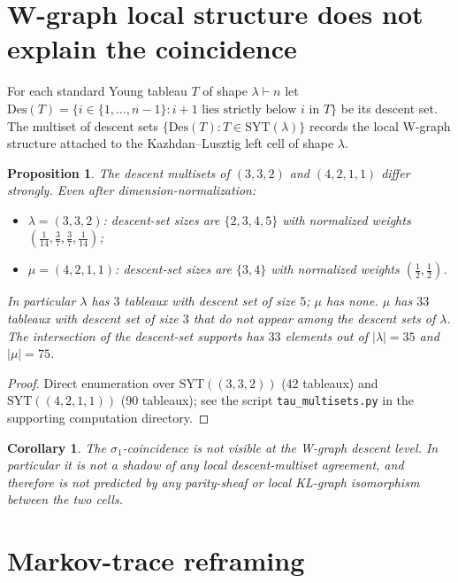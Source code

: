 \documentclass[11pt]{article}
\newtheorem{proposition}[theorem]{Proposition}
\newtheorem{corollary}[theorem]{Corollary}
\theoremstyle{definition}
\theoremstyle{remark}
\begin{document}
\section{W-graph local structure does not explain the coincidence}

For each standard Young tableau $T$ of shape $\lambda \vdash n$ let
$\mathrm{Des}(T) = \{i \in \{1, \dots, n-1\} : i+1 \text{ lies strictly below } i \text{ in } T\}$
be its descent set.  The multiset of descent sets $\{\mathrm{Des}(T)
: T \in \mathrm{SYT}(\lambda)\}$ records the local W-graph structure
attached to the Kazhdan--Lusztig left cell of shape $\lambda$.

\begin{proposition}
The descent multisets of $(3,3,2)$ and $(4,2,1,1)$ differ strongly.
Even after dimension-normalization:
\begin{itemize}
\item $\lambda = (3,3,2)$: descent-set sizes are
  $\{2, 3, 4, 5\}$ with normalized weights
  $(\tfrac{1}{14}, \tfrac{3}{7}, \tfrac{3}{7}, \tfrac{1}{14})$;
\item $\mu = (4,2,1,1)$: descent-set sizes are $\{3, 4\}$ with
  normalized weights $(\tfrac{1}{2}, \tfrac{1}{2})$.
\end{itemize}
In particular $\lambda$ has $3$ tableaux with descent set of size $5$;
$\mu$ has none. $\mu$ has $33$ tableaux with descent set of size $3$
that do not appear among the descent sets of $\lambda$.  The
intersection of the descent-set supports has $33$ elements out of
$|\lambda|=35$ and $|\mu|=75$.
\end{proposition}

\begin{proof}
Direct enumeration over $\mathrm{SYT}((3,3,2))$ (42 tableaux) and
$\mathrm{SYT}((4,2,1,1))$ (90 tableaux); see the script
\texttt{tau\_multisets.py} in the supporting computation directory.
\end{proof}

\begin{corollary}
The $\sigma_1$-coincidence is not visible at the W-graph descent
level.  In particular it is not a shadow of any local
descent-multiset agreement, and therefore is not predicted by any
parity-sheaf or local KL-graph isomorphism between the two cells.
\end{corollary}

\section{Markov-trace reframing}
\end{document}
